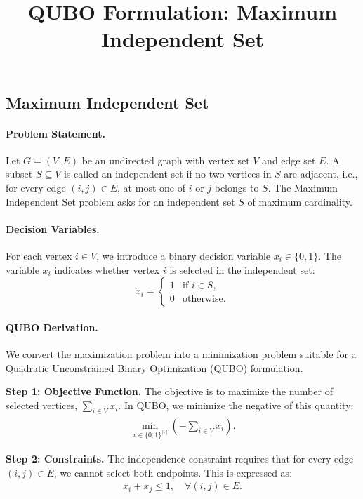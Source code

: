 \documentclass[12pt]{article}
\title{QUBO Formulation: Maximum Independent Set}
\date{}
\begin{document}
\maketitle

\subsection*{Maximum Independent Set}

\paragraph{Problem Statement.}
Let $G=(V,E)$ be an undirected graph with vertex set $V$ and edge set $E$. A subset $S \subseteq V$ is called an independent set if no two vertices in $S$ are adjacent, i.e., for every edge $(i,j) \in E$, at most one of $i$ or $j$ belongs to $S$. The Maximum Independent Set problem asks for an independent set $S$ of maximum cardinality.

\paragraph{Decision Variables.}
For each vertex $i \in V$, we introduce a binary decision variable $x_i \in \{0,1\}$. The variable $x_i$ indicates whether vertex $i$ is selected in the independent set:
\[
x_i = \begin{cases} 
1 & \text{if } i \in S, \\
0 & \text{otherwise}.
\end{cases}
\]

\paragraph{QUBO Derivation.}
We convert the maximization problem into a minimization problem suitable for a Quadratic Unconstrained Binary Optimization (QUBO) formulation.

\textbf{Step 1: Objective Function.}
The objective is to maximize the number of selected vertices, $\sum_{i \in V} x_i$. In QUBO, we minimize the negative of this quantity:
\begin{align}
\min_{x \in \{0,1\}^{|V|}} \left( -\sum_{i \in V} x_i \right).
\end{align}

\textbf{Step 2: Constraints.}
The independence constraint requires that for every edge $(i,j) \in E$, we cannot select both endpoints. This is expressed as:
\begin{align}
x_i + x_j \le 1, \quad \forall (i,j) \in E.
\end{align}
\end{document}
